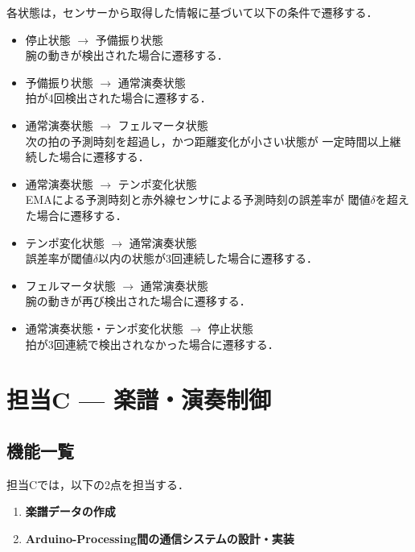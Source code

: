 \documentclass[lualatex,book,paper=a4paper,jafontsize=11.5pt,jafontscale=1.05,oneside]{jlreq}
\begin{document}
各状態は，センサーから取得した情報に基づいて以下の条件で遷移する．

\begin{itemize}

\item 停止状態 $\rightarrow$ 予備振り状態\\
腕の動きが検出された場合に遷移する．

\item 予備振り状態 $\rightarrow$ 通常演奏状態\\
拍が4回検出された場合に遷移する．

\item 通常演奏状態 $\rightarrow$ フェルマータ状態\\
次の拍の予測時刻を超過し，かつ距離変化が小さい状態が
一定時間以上継続した場合に遷移する．

\item 通常演奏状態 $\rightarrow$ テンポ変化状態\\
EMAによる予測時刻と赤外線センサによる予測時刻の誤差率が
閾値$\delta$を超えた場合に遷移する．

\item テンポ変化状態 $\rightarrow$ 通常演奏状態\\
誤差率が閾値$\delta$以内の状態が3回連続した場合に遷移する．

\item フェルマータ状態 $\rightarrow$ 通常演奏状態\\
腕の動きが再び検出された場合に遷移する．

\item 通常演奏状態・テンポ変化状態 $\rightarrow$ 停止状態\\
拍が3回連続で検出されなかった場合に遷移する．

\end{itemize} \section{担当C — 楽譜・演奏制御}

\subsection{機能一覧}
担当Cでは，以下の2点を担当する．
\begin{enumerate}
  \renewcommand{\labelenumi}{(\arabic{enumi})}
  
\item \textbf{楽譜データの作成}

\item \textbf{Arduino-Processing間の通信システムの設計・実装}

\end{enumerate}
\end{document}
